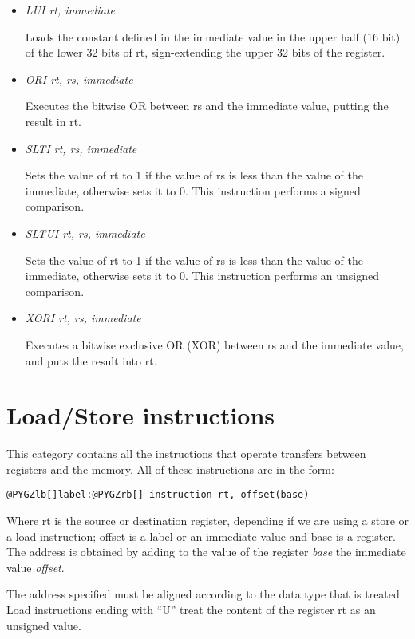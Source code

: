 \documentclass[letterpaper,10pt,english]{sphinxmanual}
\begin{document}
\begin{itemize}
\item {} 
\emph{LUI rt, immediate}

Loads the constant defined in the immediate value in the upper half (16 bit) of the lower 32 bits of rt, sign-extending the upper 32 bits of the register.

\item {} 
\emph{ORI rt, rs, immediate}

Executes the bitwise OR between rs and the immediate value, putting the result in rt.

\item {} 
\emph{SLTI rt, rs, immediate}

Sets the value of rt to 1 if the value of rs is less than the value of the immediate, otherwise sets it to 0. This instruction performs a signed comparison.

\item {} 
\emph{SLTUI rt, rs, immediate}

Sets the value of rt to 1 if the value of rs is less than the value of the immediate, otherwise sets it to 0. This instruction performs an unsigned comparison.

\item {} 
\emph{XORI rt, rs, immediate}

Executes a bitwise exclusive OR (XOR) between rs and the immediate value, and puts the result into rt.

\end{itemize}


\section{Load/Store instructions}
\label{instructions:load-store-instructions}
This category contains all the instructions that operate transfers between
registers and the memory. All of these instructions are in the form:

\begin{Verbatim}[commandchars=@\[\]]
@PYGZlb[]label:@PYGZrb[] instruction rt, offset(base)
\end{Verbatim}

Where rt is the source or destination register, depending if we are using a
store or a load instruction; offset is a label or an immediate value and base is
a register. The address is obtained by adding to the value of the register
\emph{base} the immediate value \emph{offset}.

The address specified must be aligned according to the data type that is
treated. Load instructions ending with ``U'' treat the content of the register
rt as an unsigned value.
\end{document}
